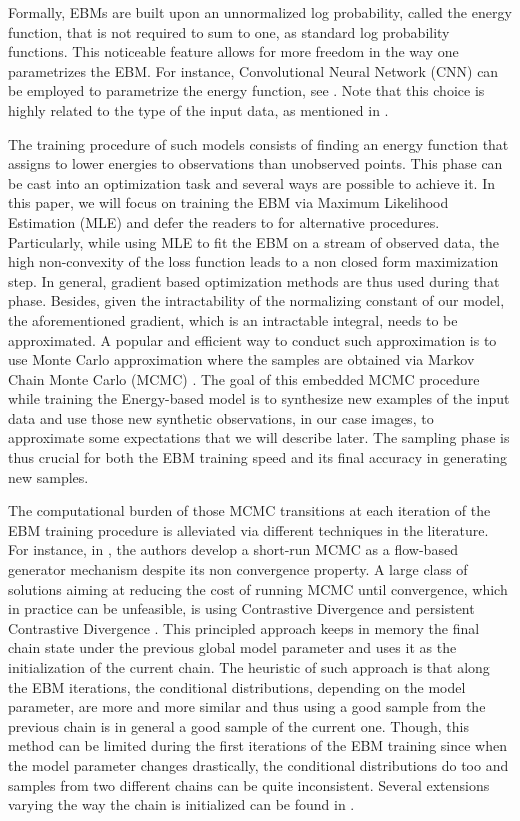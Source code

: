 \documentclass[10pt,twocolumn,letterpaper]{article}
\begin{document}
Formally, EBMs are built upon an unnormalized log probability, called the energy function, that is not required to sum to one, as standard log probability functions.
This noticeable feature allows for more freedom in the way one parametrizes the EBM.
For instance, Convolutional Neural Network (CNN) can be employed to parametrize the energy function, see \cite{xie2016theory}.
Note that this choice is highly related to the type of the input data, as mentioned in \cite{song2021train}.

The training procedure of such models consists of finding an energy function that assigns to lower energies to observations than unobserved points.
This phase can be cast into an optimization task and several ways are possible to achieve it.
In this paper, we will focus on training the EBM via Maximum Likelihood Estimation (MLE) and defer the readers to \cite{song2021train} for alternative procedures.
Particularly, while using MLE to fit the EBM on a stream of observed data, the high non-convexity of the loss function leads to a non closed form maximization step. In general, gradient based optimization methods are thus used during that phase.
Besides, given the intractability of the normalizing constant of our model, the aforementioned gradient, which is an intractable integral, needs to be approximated.
A popular and efficient way to conduct such approximation is to use Monte Carlo approximation where the samples are obtained via Markov Chain Monte Carlo (MCMC) \cite{meyn2012markov}.
The goal of this embedded MCMC procedure while training the Energy-based model is to synthesize new examples of the input data and use those new synthetic observations, in our case images, to approximate some expectations that we will describe later.
The sampling phase is thus crucial for both the EBM training speed and its final accuracy in generating new samples.

The computational burden of those MCMC transitions at each iteration of the EBM training procedure is alleviated via different techniques in the literature.
For instance, in \cite{nijkamp2019learning}, the authors develop a short-run MCMC as a flow-based generator mechanism despite its non convergence property.
A large class of solutions aiming at reducing the cost of running MCMC until convergence, which in practice can be unfeasible, is using Contrastive Divergence \cite{hinton2002training} and persistent Contrastive Divergence \cite{tieleman2008training}.
This principled approach keeps in memory the final chain state under the previous global model parameter and uses it as the initialization of the current chain.
The heuristic of such approach is that along the EBM iterations, the conditional distributions, depending on the model parameter, are more and more similar and thus using a good sample from the previous chain is in general a good sample of the current one.
Though, this method can be limited during the first iterations of the EBM training since when the model parameter changes drastically, the conditional distributions do too and samples from two different chains can be quite inconsistent.
Several extensions varying the way the chain is initialized can be found in \cite{welling2002new,gao2018learning,du2019implicit}.
\end{document}

